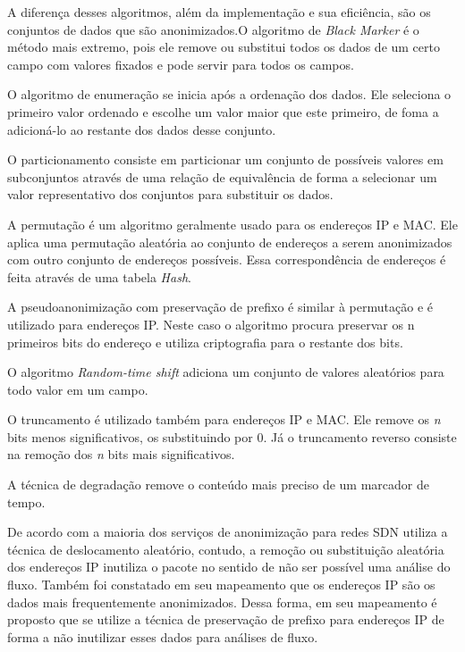A diferença desses algoritmos, além da implementação e sua eficiência, são os conjuntos de dados que são anonimizados.O algoritmo de \emph{Black Marker} é o método mais extremo, pois ele remove ou substitui todos os dados de um certo campo com valores fixados e pode servir para todos os campos. 
\par O algoritmo de enumeração se inicia após a ordenação dos dados. Ele seleciona o primeiro valor ordenado e escolhe um valor maior que este primeiro, de foma a adicioná-lo ao restante dos dados desse conjunto. 
\par O particionamento consiste em particionar um conjunto de possíveis valores em subconjuntos através de uma relação de equivalência de forma a selecionar um valor representativo dos conjuntos para substituir os dados.
\par A permutação é um algoritmo geralmente usado para os endereços IP e MAC. Ele aplica uma permutação aleatória ao conjunto de endereços a serem anonimizados com outro conjunto de endereços possíveis. Essa correspondência de endereços é feita através de uma tabela \emph{Hash}.

\par A pseudoanonimização com preservação de prefixo é similar à permutação e é utilizado para endereços IP. Neste caso o algoritmo procura preservar os n primeiros bits do endereço e utiliza criptografia para o restante dos bits.
\par O algoritmo \emph{Random-time shift} adiciona  um conjunto de valores aleatórios para todo valor em um campo.
\par O truncamento é utilizado também para endereços IP e MAC. Ele remove os \emph{n} bits menos significativos, os substituindo por 0. Já o truncamento reverso consiste na remoção dos \emph{n} bits mais significativos.
\par A técnica de degradação remove o conteúdo mais preciso de um marcador de tempo.

De acordo com  a maioria dos serviços de anonimização para redes SDN utiliza a técnica de deslocamento aleatório, contudo, a remoção ou substituição aleatória dos endereços IP inutiliza o pacote no sentido de não ser possível uma análise do fluxo. Também foi constatado em seu mapeamento que os endereços IP são os dados mais frequentemente anonimizados. Dessa forma, em seu mapeamento é proposto que se utilize a técnica de preservação de prefixo para endereços IP de forma a não inutilizar esses dados para análises de fluxo.

